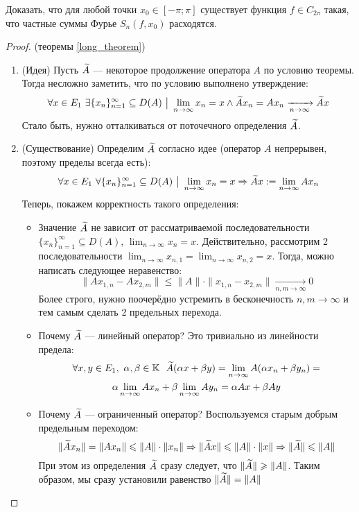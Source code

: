 \begin{exercise}
	Доказать, что для любой точки $x_0 \in [-\pi; \pi]$ существует функция $f \in C_{2\pi}$ такая, что частные суммы Фурье $S_n(f, x_0)$ расходятся.
\end{exercise}

\begin{proof} (теоремы \ref{long_theorem})
	\begin{enumerate}
		\item (Идея) Пусть $\widetilde{A}$ --- некоторое продолжение оператора $A$ по условию теоремы. Тогда несложно заметить, что по условию выполнено утверждение:
		\[
			\forall x \in E_1\ \exists \{x_n\}_{n = 1}^\infty \subseteq D(A) \ \big|\  \lim_{n \to \infty} x_n = x \wedge \widetilde{A}x_n = Ax_n \xrightarrow[n \to \infty]{} \widetilde{A}x
		\]
		Стало быть, нужно отталкиваться от поточечного определения $\widetilde{A}$.
		
		\item (Существование) Определим $\widetilde{A}$ согласно идее (оператор $A$ непрерывен, поэтому пределы всегда есть):
		\[
			\forall x \in E_1\ \forall \{x_n\}_{n = 1}^\infty \subseteq D(A) \ \big|\  \lim_{n \to \infty} x_n = x \Rightarrow \widetilde{A}x := \lim_{n \to \infty} Ax_n
		\]
		Теперь, покажем корректность такого определения:
		\begin{itemize}
			\item Значение $\widetilde{A}$ не зависит от рассматриваемой последовательности $\{x_n\}_{n = 1}^\infty \subseteq D(A)$, $\lim_{n \to \infty} x_n = x$. Действительно, рассмотрим 2 последовательности $\lim_{n \to \infty} x_{n, 1} = \lim_{n \to \infty} x_{n, 2} = x$. Тогда, можно написать следующее неравенство:
			\[
				\|Ax_{1, n} - Ax_{2, m}\| \le \|A\| \cdot \|x_{1, n} - x_{2, m}\| \xrightarrow[n, m \to \infty]{} 0
			\]
			Более строго, нужно поочерёдно устремить в бесконечность $n, m \to \infty$ и тем самым сделать 2 предельных перехода.
			
			\item Почему $\widetilde{A}$ --- линейный оператор? Это тривиально из линейности предела:
			\begin{multline*}
				\forall x, y \in E_1,\ \alpha, \beta \in \K\ \ \wdt{A}(\alpha x + \beta y) = \lim_{n \to \infty} A(\alpha x_n + \beta y_n) =
				\\
				\alpha \lim_{n \to \infty} Ax_n + \beta \lim_{n \to \infty} Ay_n = \alpha Ax + \beta Ay
			\end{multline*}
			
			\item Почему $\widetilde{A}$ --- ограниченный оператор? Воспользуемся старым добрым предельным переходом:
			\[
				\|\widetilde{A}x_n\| = \|Ax_n\| \leqslant \|A\| \cdot \|x_n\| \Rightarrow \|\widetilde{A}x\| \leqslant \|A\| \cdot \|x\| \Rightarrow \|\widetilde{A}\| \leqslant \|A\|
			\]
			При этом из определения $\widetilde{A}$ сразу следует, что $\|\widetilde{A}\| \geqslant \|A\|$. Таким образом, мы сразу установили равенство $\|\widetilde{A}\| = \|A\|$
		\end{itemize}
	

\end{enumerate}
\end{proof}
